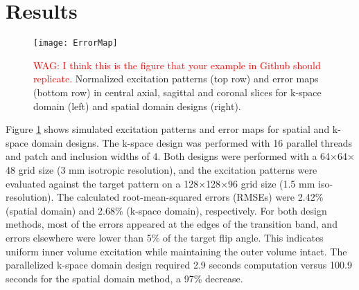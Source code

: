 \section*{Results}

\begin{figure}
	\centering
	\texttt{[image: ErrorMap]}
	\caption{\textcolor{red}{WAG: I think this is the figure that your example in Github should replicate.}
	Normalized excitation patterns (top row) and error maps (bottom row) in central axial, sagittal and coronal slices 
	for k-space domain (left) and spatial domain designs (right).}
	\label{fig:ErrorMap}
\end{figure}
Figure \ref{fig:ErrorMap} shows simulated excitation patterns and error maps for spatial and k-space domain designs. 
The k-space design was performed with 16 parallel threads and patch and inclusion widths of 4. 
Both designs were performed with a 64$\times$64$\times$48 grid size (3 mm isotropic resolution), 
and the excitation patterns were evaluated against the target pattern on a 128$\times$128$\times$96 grid size (1.5 mm iso-resolution). 
The calculated root-mean-squared errors (RMSEs) were 2.42\% (spatial domain) and 2.68\% (k-space domain), 
respectively. 
For both design methods, most of the errors appeared at the edges of the transition band, and errors elsewhere were lower than 5\% of the target flip angle. 
This indicates uniform inner volume excitation while maintaining the outer volume intact. 
The parallelized k-space domain design required 2.9 seconds computation versus 100.9 seconds for the spatial domain method, a 97\% decrease.

